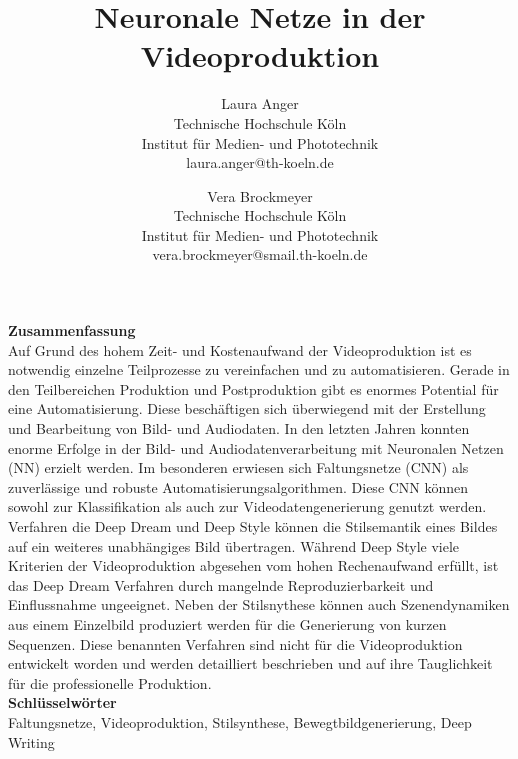 \documentclass[times, 11pt,twocolumn]{article}
\begin{document}
\title{Neuronale Netze in der Videoproduktion}

\author{Laura Anger\\
Technische Hochschule K\"oln \\ Institut f\"ur Medien- und Phototechnik \\  laura.anger@th-koeln.de \\
\and
Vera Brockmeyer\\
Technische Hochschule K\"oln \\ Institut f\"ur Medien- und Phototechnik \\ vera.brockmeyer@smail.th-koeln.de \\
}

\maketitle
\thispagestyle{empty}


\large{\textbf{Zusammenfassung}}\\ \small %
{} 
 Auf Grund des hohem Zeit- und Kostenaufwand der Videoproduktion ist es notwendig einzelne Teilprozesse zu vereinfachen und zu automatisieren. Gerade in den Teilbereichen Produktion und Postproduktion gibt es enormes Potential für eine Automatisierung. Diese beschäftigen sich überwiegend mit der Erstellung und Bearbeitung von Bild- und Audiodaten. In den letzten Jahren konnten enorme Erfolge in der Bild- und Audiodatenverarbeitung mit Neuronalen Netzen (NN) erzielt werden. Im besonderen erwiesen sich Faltungsnetze (CNN) als zuverlässige und robuste Automatisierungsalgorithmen. Diese CNN können sowohl zur Klassifikation als auch zur Videodatengenerierung genutzt werden. Verfahren die Deep Dream und Deep Style können die Stilsemantik eines Bildes auf ein weiteres unabhängiges Bild übertragen. Während Deep Style viele Kriterien der Videoproduktion abgesehen vom hohen Rechenaufwand erfüllt, ist das Deep Dream Verfahren durch mangelnde Reproduzierbarkeit und Einflussnahme ungeeignet. Neben der Stilsnythese können auch Szenendynamiken aus einem Einzelbild produziert werden für die Generierung von kurzen Sequenzen.
 Diese benannten Verfahren sind nicht für die Videoproduktion entwickelt worden und werden detailliert beschrieben und auf ihre Tauglichkeit für die professionelle Produktion. \\


\large{\textbf{Schl\"usselw\"orter}}\\ \small %
 Faltungsnetze, Videoproduktion, Stilsynthese, Bewegtbildgenerierung, Deep Writing
\end{document}

